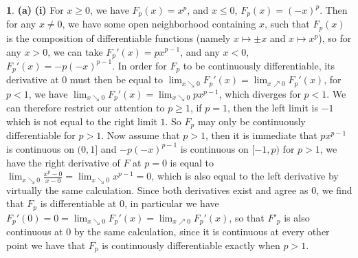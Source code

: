 \documentclass[10.5pt]{article}
\theoremstyle{definition}
\newtheorem{pb}{}
\begin{document}
    \begin{pb}
        \textbf{(a)} \textbf{(i)} For \(x \geq 0\), we have \(F_p(x) = x^p\), and \(x \leq 0\), \(F_p(x) = (-x)^p\).
        Then for any \(x \neq 0\), we have some open neighborhood containing \(x\), such that \(F_p(x)\) is the composition of differentiable functions (namely \(x \mapsto \pm x\) and \(x \mapsto x^p\)), so for any \(x > 0\), we can take \(F_p'(x) = px^{p-1}\), and any \(x < 0\),
        \(F_p'(x) = -p(-x)^{p-1}\). In order for \(F_p\) to be continuously differentiable, its derivative at \(0\) must then be equal to \(\lim_{x\searrow 0}F_p'(x) = \lim_{x\nearrow 0}F_p'(x)\), for \(p < 1\), we have \(\lim_{x\searrow 0}F_p'(x) = \lim_{x\searrow 0}px^{p-1}\), which diverges for \(p < 1\). We can therefore restrict our attention to \(p \geq 1\), if \(p = 1\), then the left limit is \(-1\) which is not equal to the right limit \(1\). So \(F_p\) may only be continuously differentiable for \(p > 1\). Now assume that \(p > 1\), then
        it is immediate that \(px^{p-1}\) is continuous on \((0,1]\) and \(-p(-x)^{p-1}\) is continuous on \([-1,p)\) for \(p > 1\), we have the right derivative of \(F\) at \(p = 0\) is equal to \(\lim_{x\searrow 0} \frac{x^p - 0}{x - 0} = \lim_{x\searrow0} x^{p-1} = 0\), which is also equal to the left derivative by virtually the same calculation. Since both derivatives exist and agree as \(0\), we find that \(F_p\) is differentiable at \(0\), in particular we have \(F_p'(0) = 0 = \lim_{x\searrow 0}F_p'(x) = \lim_{x\nearrow 0}F_p'(x)\), so that \(F'_p\) is also continuous at \(0\) by the same calculation, since it is continuous at every other point we have that \(F_p\) is continuously differentiable exactly when \(p > 1\).


\end{pb}
\end{document}
